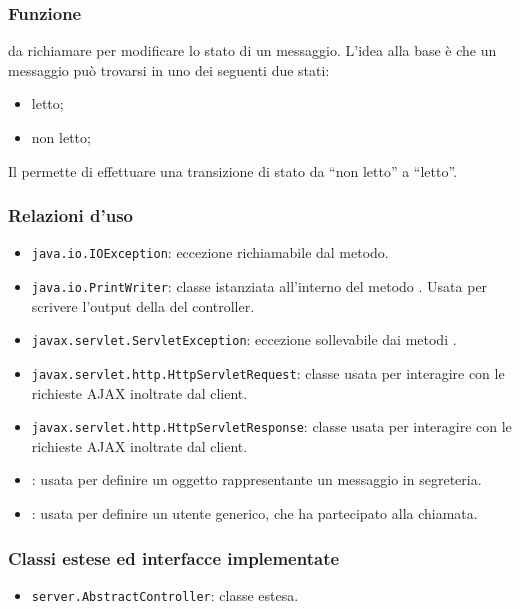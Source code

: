 
\subsubsection*{Funzione}
 da richiamare per modificare lo stato di un messaggio. L'idea alla base è che un messaggio può trovarsi in uno dei seguenti due stati:
\begin{itemize}
	\item letto;
	\item non letto;
\end{itemize}
Il  permette di effettuare una transizione di stato da ``non letto'' a ``letto''.

\subsubsection*{Relazioni d'uso}
\begin{itemize}
	\item \texttt{java.io.IOException}: eccezione richiamabile dal metodo.
	\item \texttt{java.io.PrintWriter}: classe istanziata all'interno del metodo . Usata per scrivere l'output della del controller.
	\item \texttt{javax.servlet.ServletException}: eccezione sollevabile dai metodi .
	\item \texttt{javax.servlet.http.HttpServletRequest}: classe usata per interagire con le richieste AJAX inoltrate dal client.
	\item \texttt{javax.servlet.http.HttpServletResponse}: classe usata per interagire con le richieste AJAX inoltrate dal client.
	\item {}: usata per definire un oggetto rappresentante un messaggio in segreteria.
	\item {}: usata per definire un utente generico, che ha partecipato alla chiamata.
\end{itemize}

\subsubsection*{Classi estese ed interfacce implementate}
\begin{itemize}
	\item \texttt{server.AbstractController}: classe estesa.
\end{itemize}

